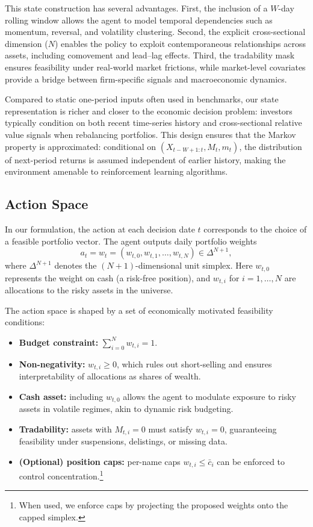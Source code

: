 \documentclass[10pt,leqno]{amsart}
\begin{document}
This state construction has several advantages. First, the inclusion of a $W$-day rolling window allows the agent to model temporal dependencies such as momentum, reversal, and volatility clustering. Second, the explicit cross-sectional dimension ($N$) enables the policy to exploit contemporaneous relationships across assets, including comovement and lead--lag effects. Third, the tradability mask ensures feasibility under real-world market frictions, while market-level covariates provide a bridge between firm-specific signals and macroeconomic dynamics. 

Compared to static one-period inputs often used in benchmarks, our state representation is richer and closer to the economic decision problem: investors typically condition on both recent time-series history and cross-sectional relative value signals when rebalancing portfolios. This design ensures that the Markov property is approximated: conditional on $(X_{t-W+1:t}, M_t, m_t)$, the distribution of next-period returns is assumed independent of earlier history, making the environment amenable to reinforcement learning algorithms.

\subsection{Action Space}

In our formulation, the action at each decision date $t$ corresponds to the choice of a feasible portfolio vector. The agent outputs daily portfolio weights
\[
a_t = w_t = (w_{t,0}, w_{t,1}, \dots, w_{t,N}) \in \Delta^{N+1},
\]
where $\Delta^{N+1}$ denotes the $(N{+}1)$-dimensional unit simplex. Here $w_{t,0}$ represents the weight on cash (a risk-free position), and $w_{t,i}$ for $i=1,\dots,N$ are allocations to the risky assets in the universe.

The action space is shaped by a set of economically motivated feasibility conditions:
\begin{itemize}
    \item \textbf{Budget constraint:} $\sum_{i=0}^N w_{t,i} = 1$.
    \item \textbf{Non-negativity:} $w_{t,i} \geq 0$, which rules out short-selling and ensures interpretability of allocations as shares of wealth.
    \item \textbf{Cash asset:} including $w_{t,0}$ allows the agent to modulate exposure to risky assets in volatile regimes, akin to dynamic risk budgeting.
    \item \textbf{Tradability:} assets with $M_{t,i}=0$ must satisfy $w_{t,i}=0$, guaranteeing feasibility under suspensions, delistings, or missing data.
    \item \textbf{(Optional) position caps:} per-name caps $w_{t,i} \le \bar{c}_i$ can be enforced to control concentration.\footnote{When used, we enforce caps by projecting the proposed weights onto the capped simplex.}
\end{itemize}
\end{document}
